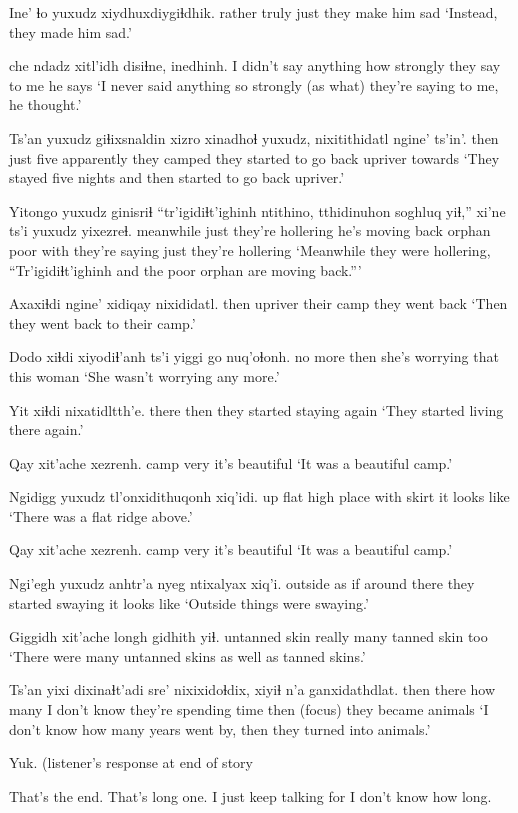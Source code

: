 \documentclass[12pt]{article}
\begin{document}
\gll Ine'    ɬo yuxudz {xiydhuxdiygiɬdhik.}
rather  truly just {they make him sad}
\glt `Instead, they made him sad.'
\glend

     che ndadz xitl'idh disiɬne,        inedhinh.
{I didn't say anything} {}     how    strongly {they say to me} {he says}
\glt `I never said anything so strongly (as what) they're saying to me, he thought.'
\glend

\gll Ts'an yuxudz giɬixsnaldin xizro xinadhoɬ    yuxudz, nixitithidatl           ngine' ts'in'.
then     just    five        apparently      {they camped}  {} {they started to go back} upriver towards
\glt `They stayed five nights and then started to go back upriver.'
\glend

\gll Yitongo yuxudz ginisriɬ ``tr'igidiɬt'ighinh ntithino,       tthidinuhon soghluq yiɬ,'' xi'ne ts'i   yuxudz yixezreɬ.
meanwhile just {they're hollering} {}                {he's moving back} orphan poor     with {they're saying} {} just {they're hollering}
\glt `Meanwhile they were hollering, ``Tr'igidiɬt'ighinh and the poor orphan are moving back.'''
\glend

\gll Axaxiɬdi ngine' xidiqay    nixididatl.
then   upriver {their camp} {they went back}
\glt `Then they went back to their camp.'
\glend

\gll Dodo    xiɬdi xiyodiɬ'anh    ts'i yiggi go   nuq'oɬonh.
{no more} then {she's worrying} {} that  this woman
\glt `She wasn't worrying any more.'
\glend

\gll Yit   xiɬdi nixatidltth'e.
there then  {they started staying again}
\glt `They started living there again.'
\glend

\gll Qay xit'ache xezrenh.
camp  very  {it's beautiful  }
\glt `It was a beautiful camp.'
\glend

\gll Ngidigg yuxudz tl'onxidithuqonh           xiq'idi.
up       {}    {flat high place with skirt} {it looks like}
\glt `There was a flat ridge above.'
\glend

\gll Qay xit'ache xezrenh.       
camp very {it's beautiful} 
\glt `It was a beautiful camp.' 
\glend

\gll Ngi'egh yuxudz anhtr'a nyeg          ntixalyax        xiq'i.
outside    {}    {as if} {around there} {they started swaying} {it looks like}
\glt `Outside things were swaying.'
\glend

\gll Giggidh        xit'ache longh gidhith      yiɬ.
{untanned skin} really   many  {tanned skin} too
\glt `There were many untanned skins as well as tanned skins.'
\glend

\gll Ts'an yixi  dixinaɬt'adi sre'         nixixidoɬdix, xiyiɬ n'a ganxidathdlat. 
then  there {how many}   {I don't know} {they're spending time} then  {(focus)}   {they became animals }
\glt `I don't know how many years went by, then they turned into animals.'
\glend

\gll Yuk.
{{(listener's response at end of story}}
\glt  
\glend

That's the end. That's long one. I just keep talking for I don't know how long.
\end{document}
